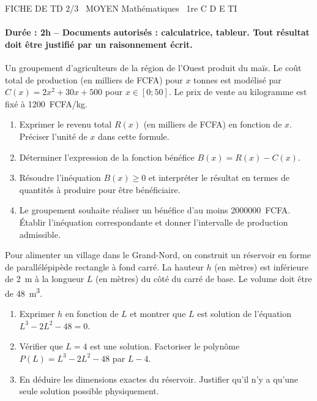 \documentclass[11pt]{article}
\begin{document}
\begin{tcolorbox}[enhanced,colback=popink,colframe=popink,arc=10pt,boxrule=0pt,left=12pt,right=12pt,top=9pt,bottom=9pt]
{\color{white}\popxbold\small FICHE DE TD 2/3 \textbullet\ MOYEN \hfill Mathématiques \textbullet\ 1re C D E TI\par}
\end{tcolorbox}
\vspace{4pt}
\paragraph{Durée : 2h -- Documents autorisés : calculatrice, tableur. Tout résultat doit être justifié par un raisonnement écrit.}

\begin{exercice}
Un groupement d'agriculteurs de la région de l'Ouest produit du maïs. Le coût total de production (en milliers de FCFA) pour $x$ tonnes est modélisé par $C(x)=2x^2+30x+500$ pour $x\in[0; 50]$. Le prix de vente au kilogramme est fixé à \SI{1200}{FCFA/kg}.
\begin{enumerate}
    \item Exprimer le revenu total $R(x)$ (en milliers de FCFA) en fonction de $x$. Préciser l'unité de $x$ dans cette formule.
    \item Déterminer l'expression de la fonction bénéfice $B(x)=R(x)-C(x)$.
    \item Résoudre l'inéquation $B(x)\ge 0$ et interpréter le résultat en termes de quantités à produire pour être bénéficiaire.
    \item Le groupement souhaite réaliser un bénéfice d'au moins \SI{2000000}{FCFA}. Établir l'inéquation correspondante et donner l'intervalle de production admissible.
\end{enumerate}
\end{exercice}

\begin{exercice}
Pour alimenter un village dans le Grand-Nord, on construit un réservoir en forme de parallélépipède rectangle à fond carré. La hauteur $h$ (en mètres) est inférieure de \SI{2}{m} à la longueur $L$ (en mètres) du côté du carré de base. Le volume doit être de \SI{48}{m^3}.
\begin{enumerate}
    \item Exprimer $h$ en fonction de $L$ et montrer que $L$ est solution de l'équation $L^3-2L^2-48=0$.
    \item Vérifier que $L=4$ est une solution. Factoriser le polynôme $P(L)=L^3-2L^2-48$ par $L-4$.
    \item En déduire les dimensions exactes du réservoir. Justifier qu'il n'y a qu'une seule solution possible physiquement.
\end{enumerate}
\end{exercice}
\end{document}
